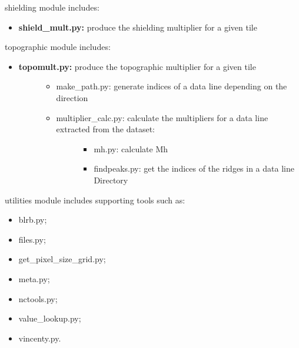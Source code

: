 \documentclass[letterpaper,10pt,english]{sphinxmanual}
\begin{document}
shielding module includes:
\begin{itemize}
\item {} 
\textbf{shield\_mult.py:} produce the shielding multiplier for a given tile

\end{itemize}

topographic module includes:
\begin{itemize}
\item {} \begin{description}
\item[{\textbf{topomult.py:} produce the topographic multiplier for a given tile}] \leavevmode\begin{itemize}
\item {} 
make\_path.py: generate indices of a data line depending on the direction

\item {} \begin{description}
\item[{multiplier\_calc.py: calculate the multipliers for a data line extracted from the dataset:}] \leavevmode\begin{itemize}
\item {} 
mh.py: calculate Mh

\item {} 
findpeaks.py: get the indices of the ridges in a data line Directory

\end{itemize}

\end{description}

\end{itemize}

\end{description}

\end{itemize}

utilities module includes supporting tools such as:
\begin{itemize}
\item {} 
blrb.py;

\item {} 
files.py;

\item {} 
get\_pixel\_size\_grid.py;

\item {} 
meta.py;

\item {} 
nctools.py;

\item {} 
value\_lookup.py;

\item {} 
vincenty.py.

\end{itemize}
\end{document}
